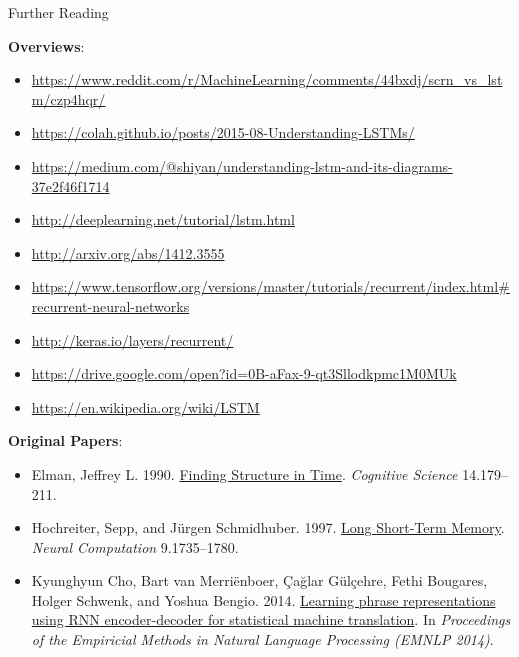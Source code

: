 \documentclass[xcolor=pdftex,x11names,table,hyperref]{beamer}
\begin{document}
\begin{frame}{Further Reading}

\textbf{Overviews}: \\[0.5em]
\begin{minipage}{1.1\textwidth}
\begin{tiny}
\begin{itemize}
	\item \url{https://www.reddit.com/r/MachineLearning/comments/44bxdj/scrn\_vs\_lstm/czp4hqr/}
	\item \url{https://colah.github.io/posts/2015-08-Understanding-LSTMs/}
	\item \url{https://medium.com/@shiyan/understanding-lstm-and-its-diagrams-37e2f46f1714}
	\item \url{http://deeplearning.net/tutorial/lstm.html}
	\item \url{http://arxiv.org/abs/1412.3555}
	\item \url{https://www.tensorflow.org/versions/master/tutorials/recurrent/index.html\#recurrent-neural-networks}
	\item \url{http://keras.io/layers/recurrent/}
	\item \url{https://drive.google.com/open?id=0B-aFax-9-qt3Sllodkpmc1M0MUk}
	\item \url{https://en.wikipedia.org/wiki/LSTM}
\end{itemize}
\end{tiny}
\end{minipage}

\vspace{1.0em}
\textbf{Original Papers}:
\begin{tiny}
\begin{itemize}
	\item Elman, Jeffrey L. 1990. \href{http://citeseerx.ist.psu.edu/viewdoc/summary?doi=10.1.1.28.9476}{Finding Structure in Time}. \textit{Cognitive Science} 14.179--211.
	\item Hochreiter, Sepp, and J\"{u}rgen Schmidhuber. 1997. \href{http://deeplearning.cs.cmu.edu/pdfs/Hochreiter97_lstm.pdf}{Long Short-Term Memory}. \textit{Neural Computation} 9.1735--1780.
	\item Kyunghyun Cho, Bart van Merri\"{e}nboer, \c{C}a\u{g}lar G\"{u}l\c{c}ehre, Fethi Bougares, Holger Schwenk, and Yoshua Bengio. 2014. \href{https://arxiv.org/abs/1406.1078}{Learning phrase representations using RNN encoder-decoder for statistical machine translation}. In \textit{Proceedings of the Empiricial Methods in Natural Language Processing (EMNLP 2014)}.
\end{itemize}
\end{tiny}
\end{frame}


\end{document}
